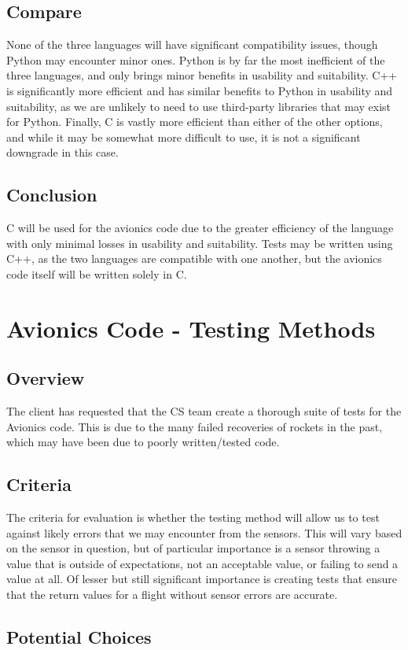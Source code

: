 \documentclass[onecolumn, draftclsnofoot,10pt, compsoc]{IEEEtran}
\begin{document}
\subsection{Compare}
None of the three languages will have significant compatibility issues, though Python may encounter minor ones. Python is by far the most inefficient of the three languages, and only brings minor benefits in usability and suitability. C++ is significantly more efficient and has similar benefits to Python in usability and suitability, as we are unlikely to need to use third-party libraries that may exist for Python. Finally, C is vastly more efficient than either of the other options, and while it may be somewhat more difficult to use, it is not a significant downgrade in this case. 

\subsection{Conclusion}
C will be used for the avionics code due to the greater efficiency of the language with only minimal losses in usability and suitability. Tests may be written using C++, as the two languages are compatible with one another, but the avionics code itself will be written solely in C.


\section{Avionics Code - Testing Methods}
\subsection{Overview}
The client has requested that the CS team create a thorough suite of tests for the Avionics code. This is due to the many failed recoveries of rockets in the past, which may have been due to poorly written/tested code.
\subsection{Criteria}
The criteria for evaluation is whether the testing method will allow us to test against likely errors that we may encounter from the sensors. This will vary based on the sensor in question, but of particular importance is a sensor throwing a value that is outside of expectations, not an acceptable value, or failing to send a value at all. Of lesser but still significant importance is creating tests that ensure that the return values for a flight without sensor errors are accurate.
\subsection{Potential Choices}
\end{document}
